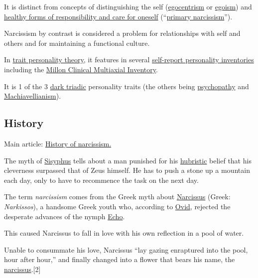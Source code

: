 \documentclass[oneside]{book}
\numberwithin{equation}{section}
\begin{document}
%
It is distinct from concepts of distinguishing the self (\href{https://en.wikipedia.org/wiki/Egocentrism}{egocentrism} or \href{https://en.wikipedia.org/wiki/Egoism}{egoism}) and \href{https://en.wikipedia.org/wiki/Healthy_narcissism}{healthy forms of responsibility and care for oneself} (``\href{https://en.wikipedia.org/wiki/Primary_narcissism}{primary narcissism}'').

Narcissism by contrast is considered a problem for relationships with self and others and for maintaining a functional culture.

In \href{https://en.wikipedia.org/wiki/Trait_theory}{trait personality theory}, it features in several \href{https://en.wikipedia.org/wiki/Self-report_inventory}{self-report personality inventories} including the \href{https://en.wikipedia.org/wiki/Millon_Clinical_Multiaxial_Inventory}{Millon Clinical Multiaxial Inventory}.

It is 1 of the 3 \href{https://en.wikipedia.org/wiki/Dark_triad}{dark triadic} personality traits (the others being \href{https://en.wikipedia.org/wiki/Psychopathy}{psychopathy} and \href{https://en.wikipedia.org/wiki/Machiavellianism_(psychology)}{Machiavellianism}).

\subsection{History}
Main article: \href{https://en.wikipedia.org/wiki/History_of_narcissism}{History of narcissism.}

\textsf{The myth of \href{https://en.wikipedia.org/wiki/Sisyphus}{Sisyphus} tells about a man punished for his \href{https://en.wikipedia.org/wiki/Hubris}{hubristic} belief that his cleverness surpassed that of Zeus himself. He has to push a stone up a mountain each day, only to have to recommence the task on the next day.}

The term \textit{narcissism} comes from the Greek myth about \href{https://en.wikipedia.org/wiki/Narcissus_(mythology)}{Narcissus} (Greek: \textit{Narkissos}), a handsome Greek youth who, according to \href{https://en.wikipedia.org/wiki/Ovid}{Ovid}, rejected the desperate advances of the nymph \href{https://en.wikipedia.org/wiki/Echo_(mythology)}{Echo}.

This caused Narcissus to fall in love with his own reflection in a pool of water.

Unable to consummate his love, Narcissus ``lay gazing enraptured into the pool, hour after hour,'' and finally changed into a flower that bears his name, the \href{https://en.wikipedia.org/wiki/Narcissus_(plant)}{narcissus}.[2]
\end{document}

